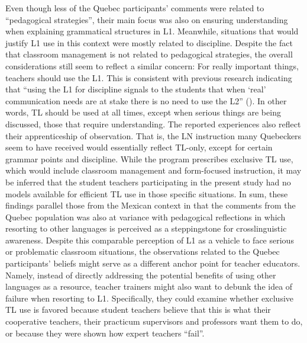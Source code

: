 \documentclass[output=paper]{../langscibook}
\begin{document}
Even though less of the Quebec participants’ comments were related to “pedagogical strategies”, their main focus was also on ensuring understanding when explaining grammatical structures in L1. Meanwhile, situations that would justify L1 use in this context were mostly related to discipline. Despite the fact that classroom management is not related to pedagogical strategies, the overall considerations still seem to reflect a similar concern: For really important things, teachers should use the L1. This is consistent with previous research indicating that “using the L1 for discipline signals to the students that when ‘real’ communication needs are at stake there is no need to use the L2” (\citealt[234]{EllisShintani2014}). In other words, TL should be used at all times, except when serious things are being discussed, those that require understanding. The reported experiences also reflect their apprenticeship of observation. That is, the LN instruction many Quebeckers seem to have received would essentially reflect TL-only, except for certain grammar points and discipline. While the program prescribes exclusive TL use, which would include classroom management and form-focused instruction, it may be inferred that the student teachers participating in the present study had no models available for efficient TL use in those specific situations. In sum, these findings parallel those from the Mexican context in that the comments from the Quebec population was also at variance with pedagogical reflections in which resorting to other languages is perceived as a steppingstone for crosslinguistic awareness. Despite this comparable perception of L1 as a vehicle to face serious or problematic classroom situations, the observations related to the Quebec participants’ beliefs might serve as a different anchor point for teacher educators. Namely, instead of directly addressing the potential benefits of using other languages as a resource, teacher trainers might also want to debunk the idea of failure when resorting to L1. Specifically, they could examine whether exclusive TL use is favored because student teachers believe that this is what their cooperative teachers, their practicum supervisors and professors want them to do, or because they were shown how expert teachers “fail”.
\end{document}
